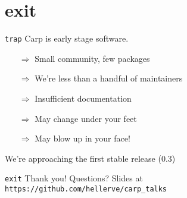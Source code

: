 \documentclass{beamer}
\begin{document}
  \section{exit}
  \begin{frame}{\texttt{trap}}
    Carp is early stage software.
    \begin{itemize}
      \item[$\Rightarrow$] Small community, few packages
      \item[$\Rightarrow$] We’re less than a handful of maintainers
      \item[$\Rightarrow$] Insufficient documentation
      \item[$\Rightarrow$] May change under your feet
      \item[$\Rightarrow$] May blow up in your face!
    \end{itemize}
    We’re approaching the first stable release (0.3)
  \end{frame}
%
  \begin{frame}{\texttt{exit}}
    \Huge Thank you!
    \linebreak
    \linebreak
    \linebreak
    \small Questions?
    \linebreak
    \linebreak
    \tiny Slides at \texttt{https://github.com/hellerve/carp\_talks}
  \end{frame}
\end{document}
